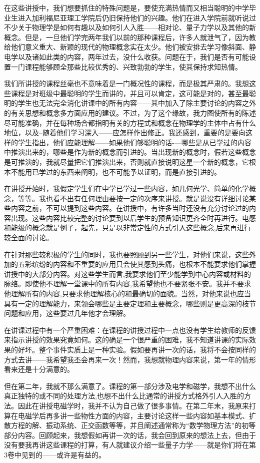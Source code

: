 \documentclass[UTF8, 12pt, a4paper, twoside]{ctexbook}
\begin{document}
在这些讲授中，我们想要抓住的特殊问题是，要使充满热情而又相当聪明的中学毕业生进入加利福尼亚理工学院后仍旧保持他们的兴趣。他们在进入学院前就听说过不少关于物理学是如何有趣以及如何引人入胜——相对论、量子力学以及其他的新概念。但是，一旦他们学完两年我们以前的那种课程后，许多人就泄气了，因为教给他们意义重大、新颖的现代的物理概念实在太少。他们被安排去学习像斜面、静电学以及诸如此类的内容，两年过去，没什么收获。问题在于，我们是否有可能设置一门课程能够顾全那些比较优秀的、兴致勃勃的学生，使其保持求知热情。
      
我们所讲授的课程丝毫也不意味着是一门概况性的课程，而是极其严肃的。我想这些课程是对班级中最聪明的学生而讲的，并且可以肯定，这可能是对的，甚至最聪明的学生也无法完全消化讲课中的所有内容——其中加入了除主要讨论的内容之外的有关思想和概念多方面应用的建议。不过，为了这个缘故，我力图使所有的陈述尽可能准确，并在每种场合都指明有关的方程式和概念在物理学的主体中占有什么地位，以及--随着他们学习深入——应怎样作出修正。我还感到，重要的是要向这样的学生指出，他们应能理解——如果他们够聪明的话-—哪些是从已学过的内容中推演出来的，哪些是作为新的概念而引进的。当出现新的概念时，假若这些概念是可推演的，我就尽量把它们推演出来，否则就直接说明这星一个新的概念，它根本不能用已学过的东西来阐明，也不可能予以证明，而是直接引进的。
      
在讲授开始时，我假定学生们在中学已学过一些内容，如几何光学、简单的化学概念，等等。我也看不出有任何理由要按一定的次序来讲授。就是说没有详细讨论某些内容之前，不可以提到这些内容。在讲授中，有许多当时还没有充分讨论过的内容出现。这些内容比较完整的讨论要到以后学生的预备知识更齐全时再进行。电感和能级的概念就是例子，起先，只是以非常定性的方式引入这些概念,后来再进行较全面的讨论。
      
在针对那些较积极的学生的同时，我也要照顾到另一些学生，对他们来说，这些外加的五彩缤纷的内容和不重要的应用只会使其感到头痛，也根本不能要求他们掌握讲授中的大部分内容。对这些学生而言,我要求他们至少能学到中心内容或材料的脉络。即使他不理解一堂课中的所有内容,我希望他也不要紧张不安。我并不要求他理解所有的内容,只要求他理解核心的和最确切的面貌。当然，对他来说也应当具有一定的理解能力，来领会哪些是主要定理和主要概念，哪些则是更高深的枝节问题和应用，这些要过几年他才会理解。

在讲课过程中有一个严重困难：在课程的讲授过程中一点也没有学生给教师的反馈来指示讲授的效果究竟如何。这的确是一个很严重的困难，我不知道讲课的实际效果的好坏。整个事件实质上是一种实验。假如要再讲一次的话，我将不会按同样的方式去讲——我希望我丕会再来一次！然而，我想就物理内容来说，第一年的情形看来还是十分满意的。
  
但在第二年，我就不那么满意了。课程的第一部分涉及电学和磁学，我想不出什么真正独特的或不同的处理方法,也想不出什么比通常的讲授方式格外引人入胜的方法。因此在讲授电磁学时，我并不认为自己做了很多事情。在第二年末，我原来打算在电磁学后再多讲一些物性方面的内容，主要讨论这样一些内容如基本模式、扩散方程的解、振动系统、正交函数等等，并且阐述通常称为“数学物理方法”的初等部分内容。回顾起来，我想假如再讲一次的话，我会回到原来的想法上去，但由于没有要我再讲这些课程的打算，有人就建议介绍一些量子力学——就是你们将在第3卷中见到的——或许是有益的。
  
\end{document}
